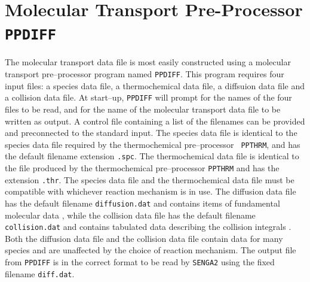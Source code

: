 \documentclass[dvips]{article}
\begin{document}
\section{Molecular Transport Pre-Processor {\tt PPDIFF}}
The molecular transport data file is most easily constructed using a
molecular transport pre--processor program named {\tt PPDIFF}.  This program
requires four input files: a species data file, a thermochemical data file,
a diffsuion data file and a collision data file.  At start--up,
{\tt PPDIFF} will prompt for the names of the four files to be read, and for
the name of the molecular transport data file to be written as output.  
A control file containing a list of the filenames can be provided
and preconnected to the standard input.  The species data file is identical
to the species data file required by the thermochemical pre--processor {\tt
PPTHRM}, and has the default filename extension {\tt .spc}.  The thermochemical
data file is identical to the file produced by the thermochemical
pre--processor {\tt PPTHRM} and has the extension {\tt .thr}.  The species data 
file and the thermochemical data file must be compatible with whichever
reaction mechanism is in use.  The diffusion
data file has the default filename {\tt diffusion.dat} and contains items of
fundamental molecular data \cite{Transport}, while the collision data file has
the default filename {\tt collision.dat} and contains tabulated data
describing the collision integrals \cite{MonchickMason}.  Both the diffusion
data file and the collision data file contain data for many species
and are unaffected by the choice of reaction mechanism.
The output file from {\tt PPDIFF} is in the correct format to be read by
{\tt SENGA2} using the fixed filename {\tt diff.dat}.
\end{document}
